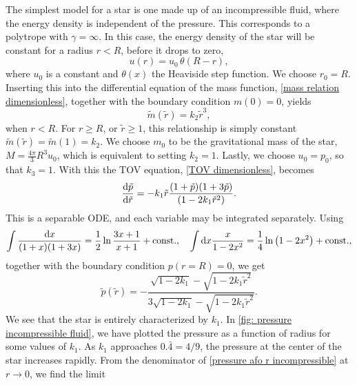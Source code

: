 The simplest model for a star is one made up of an incompressible fluid, where the energy density is independent of the pressure.
This corresponds to a polytrope with $\gamma = \infty$.
In this case, the energy density of the star will be constant for a radius $r < R$, before it drops to zero,
%
\begin{equation}
    u(r) = u_0 \, \theta (R- r),
\end{equation}
%
where $u_0$ is a constant and $\theta(x)$ the Heaviside step function.
We choose $r_0 = R$.
Inserting this into the differential equation of the mass function, \autoref{mass relation dimensionless}, together with the boundary condition $m(0) = 0$, yields
%
\begin{equation}
    \tilde m(\tilde r) = k_2 \tilde r^3,
\end{equation}
%
when $r < R$.
For $r \geq R$, or $\tilde r \geq 1$, this relationship is simply constant $\tilde m(\tilde r) = \tilde m(1) = k_2$.
We choose $m_0$ to be the gravitational mass of the star, $M = \frac{4 \pi }{3} R^3 u_0$, which is equivalent to setting $k_2 = 1$.
Lastly, we choose $u_0 = p_0$, so that $k_3 = 1$.
With this the TOV equation, \autoref{TOV dimensionless}, becomes
%
\begin{equation} 
    \odv{\tilde p}{\tilde r} 
    = - k_1 \tilde r 
    \frac{(1 + \tilde p)(1 + 3 \tilde p)}{(1 - 2 k_1 \tilde r^2)}.
\end{equation}
%
This is a separable ODE, and each variable may be integrated separately.
Using
%
\begin{align}
    \int \frac{\text{d} x}{(1 + x)(1 + 3x)}
    = \frac{1}{2} \ln \frac{3x + 1}{x + 1} + \mathrm{const.} , \quad
    \int \text{d} x \frac{x}{1 - 2 x^2} 
    = \frac{1}{4}\ln\left(1 - 2 x^2 \right)
    + \mathrm{const.},
\end{align}
%
together with the boundary condition $p(r = R) = 0$, we get 
%
\begin{equation}
    \label{pressure afo r incompressible}
    \tilde p(\tilde r) 
    = 
    - \frac{\sqrt{1 - 2 k_1} - \sqrt{1 - 2 k_1 \tilde r^2}}
    {3 \sqrt{1 - 2 k_1 } - \sqrt{1 - 2 k_1 \tilde r^2}}.
\end{equation}
%
We see that the star is entirely characterized by $k_1$.
In \autoref{fig: pressure incompressible fluid}, we have plotted the pressure as a function of radius for some values of $k_1$.
As $k_1$ approaches $0.\bar 4 = 4/9$, the pressure at the center of the star increases rapidly.
From the denominator of \autoref{pressure afo r incompressible} at $r\rightarrow 0$, we find the limit
